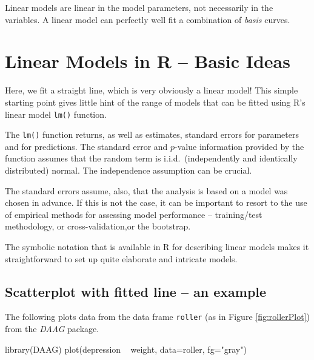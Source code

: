 Linear models are linear in the model parameters, not necessarily in
the variables. A linear model can perfectly well fit a combination of
{\em basis} curves.

\section{Linear Models in R -- Basic Ideas}

Here, we fit a straight line, which is very obviously a linear model!
This simple starting point gives little hint of the range of models
that can be fitted using R's linear model \texttt{lm()} function.

The \texttt{lm()} function returns, as well as estimates, standard
errors for parameters and for predictions. The standard error and
$p$-value information provided by the  function assumes
that the random term is i.i.d.\ (independently and identically
distributed) normal.  The independence assumption can be crucial.

The standard errors assume, also, that the analysis is based on a
model was chosen in advance.  If this is not the case, it can
be important to resort to the use of empirical methods for assessing
model performance -- training/test methodology, or cross-validation,or the bootstrap.

The symbolic notation  that is available in R for
describing linear models makes it straightforward to set up quite
elaborate and intricate models.

\subsection*{Scatterplot with fitted line -- an example}

The following plots data from the data frame \texttt{roller} (as in
Figure \ref{fig:rollerPlot}) from the \textit{DAAG} package.
\begin{Schunk}
\begin{Sinput}
library(DAAG)
plot(depression ~ weight, data=roller, fg="gray")
\end{Sinput}
\end{Schunk}

